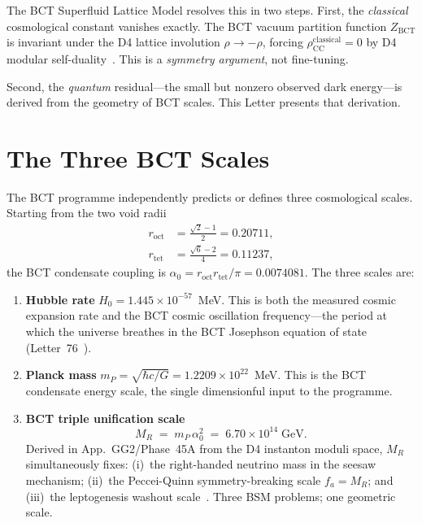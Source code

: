\documentclass[aps,prl,twocolumn,showpacs,preprintnumbers]{revtex4-2}
\newcommand{\roct}{r_{\mathrm{oct}}}
\newcommand{\rtet}{r_{\mathrm{tet}}}
\newcommand{\azero}{\alpha_0}
\newcommand{\mP}{m_P}
\newcommand{\MR}{M_R}
\newcommand{\rhoCC}{\rho_{\mathrm{CC}}}
\newcommand{\Hzero}{H_0}
\begin{document}
The BCT Superfluid Lattice Model resolves this in two steps. First, the
\emph{classical} cosmological constant vanishes exactly. The BCT vacuum partition
function $Z_{\mathrm{BCT}}$ is invariant under the D4 lattice involution
$\rho \to -\rho$, forcing $\rhoCC^{\mathrm{classical}} = 0$ by D4 modular
self-duality~\cite{appDU,letter44}. This is a \emph{symmetry argument},
not fine-tuning.

Second, the \emph{quantum} residual---the small but nonzero observed dark
energy---is derived from the geometry of BCT scales. This Letter presents
that derivation.

\section{The Three BCT Scales}

The BCT programme independently predicts or defines three cosmological scales.
Starting from the two void radii
\begin{align}
  \roct &= \tfrac{\sqrt{2}-1}{2} = 0.20711, \\
  \rtet &= \tfrac{\sqrt{6}-2}{4} = 0.11237,
\end{align}
the BCT condensate coupling is $\azero = \roct\rtet/\pi = 0.0074081$.
The three scales are:

\begin{enumerate}
  \item \textbf{Hubble rate} $\Hzero = 1.445\times10^{-57}$~MeV. This is
    both the measured cosmic expansion rate and the BCT cosmic oscillation
    frequency---the period at which the universe breathes in the BCT
    Josephson equation of state (Letter~76~\cite{letter76}).

  \item \textbf{Planck mass} $\mP = \sqrt{\hbar c/G} = 1.2209\times10^{22}$~MeV.
    This is the BCT condensate energy scale, the single dimensionful input
    to the programme.

  \item \textbf{BCT triple unification scale}
    \begin{equation}
      \MR \;=\; \mP\,\azero^2 \;=\; 6.70\times10^{14}\;\text{GeV}.
      \label{eq:MR}
    \end{equation}
    Derived in App.~GG2/Phase~45A from the D4 instanton moduli space,
    $\MR$ simultaneously fixes: (i)~the right-handed neutrino mass in the
    seesaw mechanism; (ii)~the Peccei-Quinn symmetry-breaking scale
    $f_a = \MR$; and (iii)~the leptogenesis washout scale~\cite{appGT2}.
    Three BSM problems; one geometric scale.
\end{enumerate}
\end{document}
